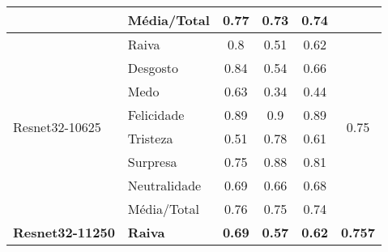 \begin{table}[]
\begin{tabular}{llcccc}
                                         & Média/Total           & 0.77                                  & 0.73                                   & 0.74                                  &                                       \\ \hline
\multirow{8}{*}{Resnet32-10625}          & Raiva                 & 0.8                                   & 0.51                                   & 0.62                                  & \multirow{8}{*}{0.75}                 \\
                                         & Desgosto              & 0.84                                  & 0.54                                   & 0.66                                  &                                       \\
                                         & Medo                  & 0.63                                  & 0.34                                   & 0.44                                  &                                       \\
                                         & Felicidade            & 0.89                                  & 0.9                                    & 0.89                                  &                                       \\
                                         & Tristeza              & 0.51                                  & 0.78                                   & 0.61                                  &                                       \\
                                         & Surpresa              & 0.75                                  & 0.88                                   & 0.81                                  &                                       \\
                                         & Neutralidade          & 0.69                                  & 0.66                                   & 0.68                                  &                                       \\
                                         & Média/Total           & 0.76                                  & 0.75                                   & 0.74                                  &                                       \\ \hline
\multirow{8}{*}{\textbf{Resnet32-11250}} & \textbf{Raiva}        & \textbf{0.69}                         & \textbf{0.57}                          & \textbf{0.62}                         & \multirow{8}{*}{\textbf{0.757}}       \\

\end{tabular}
\end{table}
